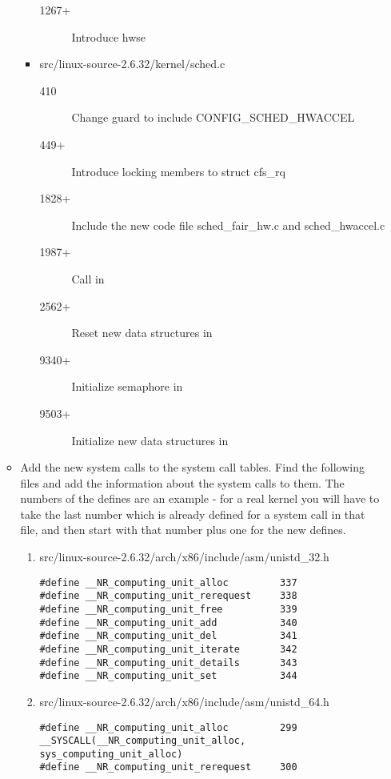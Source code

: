 \begin{enumerate}
\begin{itemize}
\begin{itemize}
\begin{description}
							\item[1267+] Introduce hwse
						\end{description}
					\item src/linux-source-2.6.32/kernel/sched.c
						\begin{description}
							\item[410] Change guard to include CONFIG\_SCHED\_HWACCEL
							\item[449+] Introduce locking members to struct cfs\_rq
							\item[1828+] Include the new code file sched\_fair\_hw.c and sched\_hwaccel.c
							\item[1987+] Call  in 
							\item[2562+] Reset new data structures in 
							\item[9340+] Initialize semaphore in 
							\item[9503+] Initialize new data structures in 
						\end{description}
				\end{itemize}
			\item Add the new system calls to the system call tables. Find the following files and add the information about the system calls to them. The numbers of the defines are an example - for a real kernel you will have to take the last number which is already defined for a system call in that file, and then start with that number plus one for the new defines.
				\begin{enumerate}
					\item src/linux-source-2.6.32/arch/x86/include/asm/unistd\_32.h
					\begin{verbatim}
#define __NR_computing_unit_alloc         337
#define __NR_computing_unit_rerequest     338
#define __NR_computing_unit_free          339
#define __NR_computing_unit_add           340
#define __NR_computing_unit_del           341
#define __NR_computing_unit_iterate       342
#define __NR_computing_unit_details       343
#define __NR_computing_unit_set           344
					\end{verbatim}
					\item src/linux-source-2.6.32/arch/x86/include/asm/unistd\_64.h
					\begin{verbatim}
#define __NR_computing_unit_alloc         299
__SYSCALL(__NR_computing_unit_alloc, sys_computing_unit_alloc)
#define __NR_computing_unit_rerequest     300

\end{verbatim}
\end{enumerate}
\end{itemize}
\end{enumerate}
